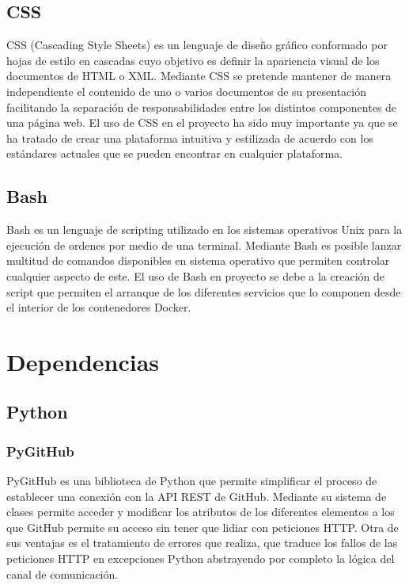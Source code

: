 \subsection{CSS}

CSS (Cascading Style Sheets) \cite{lang:css} es un lenguaje de diseño gráfico conformado por hojas de estilo en cascadas cuyo objetivo es definir la apariencia visual de los documentos de HTML o XML. Mediante CSS se pretende mantener de manera independiente el contenido de uno o varios documentos de su presentación facilitando la separación de responsabilidades entre los distintos componentes de una página web.
El uso de CSS en el proyecto ha sido muy importante ya que se ha tratado de crear una plataforma intuitiva y estilizada de acuerdo con los estándares actuales que se pueden encontrar en cualquier plataforma. 

\subsection{Bash}

Bash \cite{wiki:bash} es un lenguaje de scripting utilizado en los sistemas operativos Unix para la ejecución de ordenes por medio de una terminal. Mediante Bash es posible lanzar multitud de comandos disponibles en sistema operativo que permiten controlar cualquier aspecto de este. El uso de Bash en proyecto se debe a la creación de script que permiten el arranque de los diferentes servicios que lo componen desde el interior de los contenedores Docker.

\section{Dependencias} \label{sec:dependencias}

\subsection{Python}

\subsubsection{PyGitHub}

PyGitHub \cite{dependencies:pygithub} es una biblioteca de Python que permite simplificar el proceso de establecer una conexión con la API REST de GitHub. Mediante su sistema de clases permite acceder y modificar los atributos de los diferentes elementos a los que GitHub permite su acceso sin tener que lidiar con peticiones HTTP. Otra de sus ventajas es el tratamiento de errores que realiza, que traduce los fallos de las peticiones HTTP en excepciones Python abstrayendo por completo la lógica del canal de comunicación.

